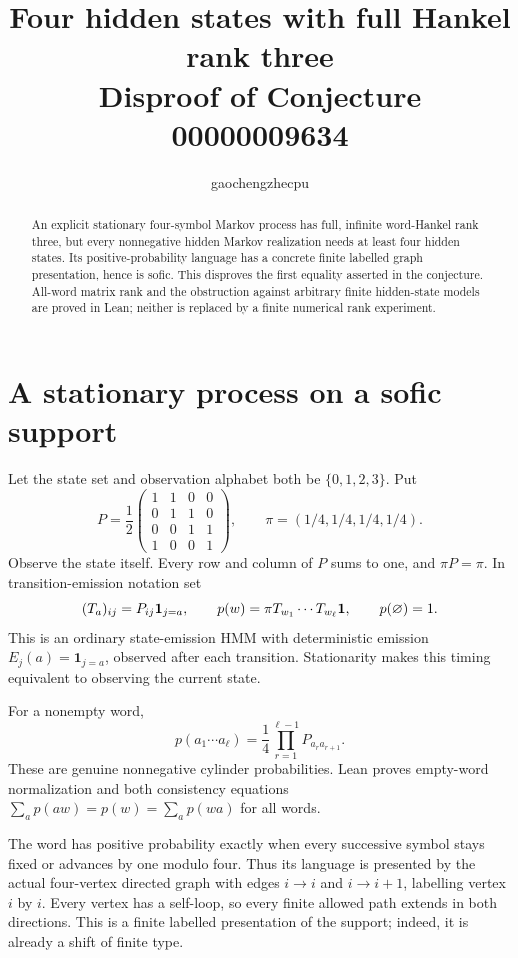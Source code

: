 \documentclass[11pt]{article}
\title{Four hidden states with full Hankel rank three\\
\large Disproof of Conjecture 00000009634}
\author{gaochengzhecpu}\date{}
\begin{document}
\maketitle
\begin{abstract}
An explicit stationary four-symbol Markov process has full,
infinite word-Hankel rank three, but every nonnegative hidden
Markov realization needs at least four hidden states. Its
positive-probability language has a concrete finite labelled
graph presentation, hence is sofic. This disproves the first
equality asserted in the conjecture. All-word matrix rank and
the obstruction against arbitrary finite hidden-state models
are proved in Lean; neither is replaced by a finite numerical
rank experiment.
\end{abstract}

\section*{A stationary process on a sofic support}
Let the state set and observation alphabet both be
$\{0,1,2,3\}$. Put
\[
 P=\frac12\begin{pmatrix}
 1&1&0&0\\0&1&1&0\\0&0&1&1\\1&0&0&1
 \end{pmatrix},\qquad
 \pi=(1/4,1/4,1/4,1/4).
\]
Observe the state itself. Every row and column of $P$ sums
to one, and $\pi P=\pi$. In transition-emission notation set
\[
 (T_a)_{ij}=P_{ij}\boldsymbol1_{j=a},\qquad
 p(w)=\pi T_{w_1}\cdots T_{w_\ell}{\bf1},\qquad
 p(\varnothing)=1.
\]
This is an ordinary state-emission HMM with deterministic
emission $E_j(a)=\boldsymbol1_{j=a}$, observed after each
transition. Stationarity makes this timing equivalent to
observing the current state.

For a nonempty word,
\[
 p(a_1\cdots a_\ell)=\frac14
                 \prod_{r=1}^{\ell-1}P_{a_r a_{r+1}}.
\]
These are genuine nonnegative cylinder probabilities.
Lean proves empty-word normalization and both consistency
equations $\sum_a p(aw)=p(w)=\sum_a p(wa)$ for all words.

The word has positive probability exactly when every
successive symbol stays fixed or advances by one modulo
four. Thus its language is presented by the actual four-vertex
directed graph with edges $i\to i$ and $i\to i+1$, labelling
vertex $i$ by $i$. Every vertex has a self-loop, so every
finite allowed path extends in both directions. This is a
finite labelled presentation of the support; indeed, it is
already a shift of finite type.
\end{document}
